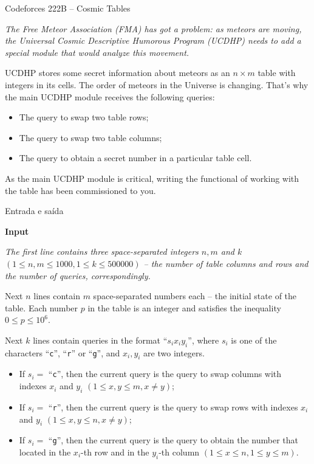 \begin{frame}[fragile]{Codeforces 222B -- Cosmic Tables}

{\it
The Free Meteor Association (FMA) has got a problem: as meteors are moving, the Universal Cosmic Descriptive Humorous Program (UCDHP) needs to add a special module that would analyze this movement.

UCDHP stores some secret information about meteors as an $n \times m$ table with integers in its cells. The order of meteors in the Universe is changing. That's why the main UCDHP module receives the following queries:

\begin{itemize}
    \item The query to swap two table rows;
    \item The query to swap two table columns;
    \item The query to obtain a secret number in a particular table cell.
\end{itemize}

As the main UCDHP module is critical, writing the functional of working with the table has been commissioned to you.
}

\end{frame}

\begin{frame}[fragile]{Entrada e saída}

\textbf{Input}

{\it
The first line contains three space-separated integers $n, m$ and $k$ $(1 \leq n, m \leq 1000, 1 \leq k \leq 500000)$ -- the number of table columns and rows and the number of queries, correspondingly.

Next $n$ lines contain $m$ space-separated numbers each -- the initial state of the table. Each number $p$ in the table is an integer and satisfies the inequality $0 \leq p \leq 10^6$.

Next $k$ lines contain queries in the format ``$s_i x_i y_i$'', where $s_i$ is one of the characters ``\texttt{с}'', ``\texttt{r}'' or ``\texttt{g}'', and $x_i, y_i$ are two integers.

\begin{itemize}
    \item If $s_i =$ ``\texttt{c}'', then the current query is the query to swap columns with indexes $x_i$ and $y_i$ $(1 \leq x, y \leq m, x \neq y)$;
    \item If $s_i =$ ``\texttt{r}'', then the current query is the query to swap rows with indexes $x_i$ and $y_i$ $(1 \leq x, y \leq n, x \neq y)$;
    \item If $s_i =$ ``\texttt{g}'', then the current query is the query to obtain the number that located in the $x_i$-th row and in the $y_i$-th column $(1 \leq x \leq n, 1 \leq y \leq m)$.
\end{itemize}
}

\end{frame}

